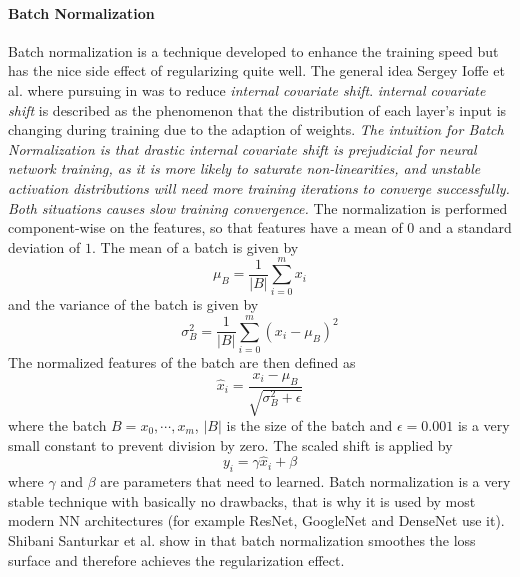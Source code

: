 \paragraph{Batch Normalization}
Batch normalization is a technique developed to enhance the training speed but has the nice side effect of regularizing quite well.
The general idea Sergey Ioffe et al. where pursuing in \cite{ioffe2015batch} was to reduce \emph{internal covariate
shift}. \emph{internal covariate
shift} is described as the phenomenon that the distribution of each layer's input is changing during training due to the adaption of weights.
\emph{ The
intuition for Batch Normalization is that drastic internal covariate
shift is prejudicial for neural network training, as it is more likely to saturate non-linearities, and unstable activation distributions
will need more training iterations to converge successfully. Both
situations causes slow training convergence.}\cite{ValdenegroToro2019DeepNN}
The normalization is performed component-wise on the features, so that features have a mean of $0$ and a standard deviation of $1$.
The mean of a batch is given by
\begin{equation}
\mu_B = \frac{1}{|B|} \sum_{i=0}^m x_i
\end{equation}
and the variance of the batch is given by
\begin{equation}
\sigma^2_B = \frac{1}{|B|} \sum_{i=0}^m (x_i - \mu_B )^2
\end{equation}
The normalized features of the batch are then defined as
\begin{equation}
\hat{x}_i = \frac{x_i - \mu_B}{\sqrt{\sigma^2_B + \epsilon}}
\end{equation}
where the batch $B = {x_0, \cdots, x_m}$,  $|B|$ is the size of the batch and $\epsilon = 0.001$ is a very small constant to prevent division by zero.
The scaled shift is applied by
\begin{equation}
y_i = \gamma \hat{x}_i + \beta
\end{equation}
where $\gamma$ and $\beta$ are parameters that need to learned.
Batch normalization is a very stable technique with basically no drawbacks, that is why it is used by most modern NN architectures (for example ResNet, GoogleNet and DenseNet use it).
Shibani Santurkar et al. show in \cite{2018arXiv180511604S} that batch normalization smoothes the loss surface and therefore achieves the regularization effect.

